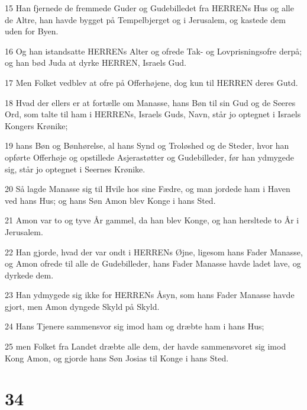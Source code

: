 \par 15 Han fjernede de fremmede Guder og Gudebilledet fra HERRENs Hus og alle de Altre, han havde bygget på Tempelbjerget og i Jerusalem, og kastede dem uden for Byen.
\par 16 Og han istandsatte HERRENs Alter og ofrede Tak- og Lovprisningsofre derpå; og han bød Juda at dyrke HERREN, Israels Gud.
\par 17 Men Folket vedblev at ofre på Offerhøjene, dog kun til HERREN deres Gutd.
\par 18 Hvad der ellers er at fortælle om Manasse, hans Bøn til sin Gud og de Seeres Ord, som talte til ham i HERRENs, Israels Guds, Navn, står jo optegnet i Israels Kongers Krønike;
\par 19 hans Bøn og Bønhørelse, al hans Synd og Troløshed og de Steder, hvor han opførte Offerhøje og opstillede Asjerastøtter og Gudebilleder, før han ydmygede sig, står jo optegnet i Seernes Krønike.
\par 20 Så lagde Manasse sig til Hvile hos sine Fædre, og man jordede ham i Haven ved hans Hus; og hans Søn Amon blev Konge i hans Sted.
\par 21 Amon var to og tyve År gammel, da han blev Konge, og han hersltede to År i Jerusalem.
\par 22 Han gjorde, hvad der var ondt i HERRENs Øjne, ligesom hans Fader Manasse, og Amon ofrede til alle de Gudebilleder, hans Fader Manasse havde ladet lave, og dyrkede dem.
\par 23 Han ydmygede sig ikke for HERRENs Åsyn, som hans Fader Manasse havde gjort, men Amon dyngede Skyld på Skyld.
\par 24 Hans Tjenere sammensvor sig imod ham og dræbte ham i hans Hus;
\par 25 men Folket fra Landet dræbte alle dem, der havde sammensvoret sig imod Kong Amon, og gjorde hans Søn Josias til Konge i hans Sted.

\chapter{34}

